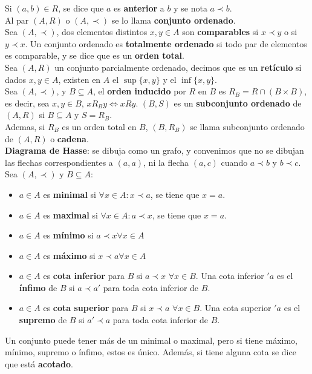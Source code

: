 \documentclass[11pt,a4paper]{article}
\begin{document}
\noindent Si $(a,b) \in R$, se dice que $a$ es \textbf{anterior} a $b$ y se nota $a \prec b$.\\

\noindent Al par $(A,R)$ o $(A, \prec)$ se lo llama \textbf{conjunto ordenado}.\\

\noindent Sea $(A, \prec)$, dos elementos distintos $x, y \in A$ son \textbf{comparables} si $x \prec y$ o si $y \prec x$. Un conjunto ordenado es \textbf{totalmente ordenado} si todo par de elementos es comparable, y se dice que es un \textbf{orden total}.\\

\noindent Sea $(A,R)$ un conjunto parcialmente ordenado, decimos que es un \textbf{ret\'iculo} si dados $x,y\in A$, existen en $A$ el $\sup\{x,y\}$ y el $\inf\{x,y\}$.\\

\noindent Sea $(A, \prec)$, y $B \subseteq A$, el \textbf{orden inducido} por $R$ en $B$ es $R_B = R \cap (B\times B)$, es decir, sea $x,y \in B$, $xR_By \iff xRy$. $(B,S)$ es un \textbf{subconjunto ordenado} de $(A,R)$ si $B \subseteq A$ y $S = R_B$. \\

\noindent Ademas, si $R_B$ es un orden total en $B$, $(B, R_B)$ se llama subconjunto ordenado de $(A, R)$ o \textbf{cadena}.\\

\noindent \textbf{Diagrama de Hasse}: se dibuja como un grafo, y convenimos que no se dibujan las flechas correspondientes a $(a,a)$, ni la flecha $(a,c)$ cuando $a \prec b$ y $b \prec c$.\\

\noindent Sea $(A, \prec)$ y $B \subseteq A$:
\begin{itemize}
\item $a \in A$ es \textbf{minimal} si $\forall x \in A : x\prec a$, se tiene que $x = a$.
\item $a \in A$ es \textbf{maximal} si $\forall x \in A : a\prec x$, se tiene que $x = a$.\\

\item $a \in A$ es \textbf{m\'inimo} si $a \prec x \forall x \in A$
\item $a \in A$ es \textbf{m\'aximo} si $x \prec a \forall x \in A$\\

\item $a \in A$ es \textbf{cota inferior} para $B$ si $a \prec x$ $\forall x \in B$. Una cota inferior $'a$ es el \textbf{\'infimo} de $B$ si $a \prec a'$ para toda cota inferior de $B$.
\item $a \in A$ es \textbf{cota superior} para $B$ si $x \prec a$ $\forall x \in B$. Una cota superior $'a$ es el \textbf{supremo} de $B$ si $a' \prec a$ para toda cota inferior de $B$.\\
\end{itemize}
\noindent Un conjunto puede tener m\'as de un minimal o maximal, pero si tiene m\'aximo, m\'inimo, supremo o \'infimo, estos es \'unico. Adem\'as, si tiene alguna cota se dice que est\'a \textbf{acotado}.
\end{document}
